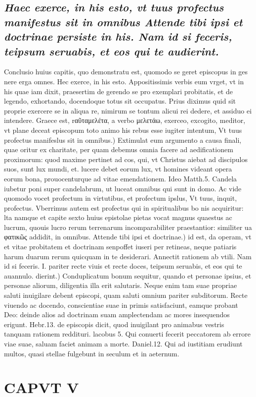 \documentclass{article}
\begin{document}
\begin{pages}
\subsection*{\textit{Haec exerce, in his esto, vt tuus profectus manifestus sit in omnibus Attende tibi ipsi et doctrinae persiste in his. Nam id si feceris, teipsum seruabis, et eos qui te audierint. }}\pstart Conclusio huius capitis, quo demonstratu est, quomodo se geret episcopus in ges nere erga omnes.  \pend\pstart Hec exerce, in his esto. Appositissimis verbis eum vrget, vt in his quae iam dixit, praesertim de gerendo se pro exemplari probitatis, et de legendo, exhortando, docendoque totus sit occupatus. Prius diximus quid sit proprie exercere se in aliqua re, nimirum se tontum alicui rei dedere, et assiduo ei intendere. Graece est, rαῦταμελέτα, a verbo μελετάω, exerceo, excogito, meditor, vt plane deceat episcopum toto animo his rebus esse iugiter intentum, Vt tuus profectus manifeslus sit in omnibus.) Extimulat eum argumento a causa finali, quae oritur ex charitate, per quam debemus omnia facere ad aedificationem proximorum: quod maxime pertinet ad cos, qui, vt Christus aiebat ad discipulos suos, sunt lux mundi, et. lucere debet eorum lux, vt homines videant opera eorum bona, prouocenturque ad vitae emendationem. Ideo Matth.5. Candela iubetur poni super candelabrum, ut luceat omnibus qui sunt in domo. Ac vide quomodo vocet profectum in virtutibus, et profectum ipslus, Vt tuus, inquit, profectus. Vberrimus autem est profectus qui in spiritualibus bo nis acquiritur: lta namque et capite sexto huius epistolae pietas vocat magnus quaestus ac lucrum, quouis lucro rerum terrenarum incomparabiliter praestantior: similiter ua φατικῶς addidit, in omnibus.  \pend\pstart Attende tibi ipsi et doctrinae.) id est, da operam, vt et vitae probitatem et doctrinam senpoffet iuseri per retineas, neque patiaris harum duarum rerum quicquam in te desiderari. Annectit rationem ab vtili.  \pend\pstart Nam id si feceris. I. pariter recte viuis et recte doces, teipsum seruabis, et eos qui te auannulo. dierint.) Conduplicatum bonum sequitur, quando et personae ipsius, et personae aliorum, diligentia illa erit salutaris. Neque enim tam suae propriae saluti inuigilare debent episcopi, quam saluti omnium pariter subditorum. Recte viuendo ac docendo, conscientiae suae in primis satisfaciunt, eamque probant Deo: deinde alios ad doctrinam suam amplectendam ac mores insequendos erigunt. Hebr.13. de episcopis dicit, quod inuigilant pro animabus vestris tanquam rationem reddituri. lacobus 5. Qui conuerti fecerit peccatorem ab errore viae suae, saluam faciet animam a morte. Daniel.12. Qui ad iustitiam erudiunt multos, quasi stellae fulgebunt in seculum et in aeternum.  \pend
\endnumbering\beginnumbering\section{CAPVT V}
{}

\end{pages}
\end{document}
